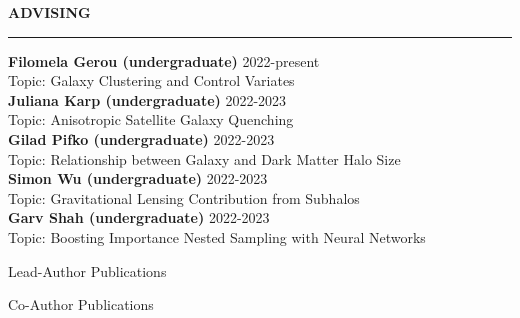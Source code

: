 \documentclass[12pt]{article}
\renewenvironment{section}[1]
  {
  \medskip
  {\color{yaleblue} \MakeUppercase{\bf #1}}
  \smallskip
  \hrule
  \medskip
  \begin{adjustwidth}{0.3cm}{}
  }
  {
  \end{adjustwidth}
  }
\newenvironment{ref-section}[1]
  {
  \medskip
  {\color{yaleblue} \MakeUppercase{\bf #1}}
  \smallskip
  \hrule
  \medskip
  \begin{refsection}
  }
  {
  \end{refsection}
  }
\newcommand{\entry}[3]{{\bf #1} \hfill {#2} \\ {#3}}
\begin{document}
\begin{section}{Advising}
  \entry{Filomela Gerou (undergraduate)}{2022-present}{Topic: Galaxy Clustering and Control Variates} \medskip \\
  \entry{Juliana Karp (undergraduate)}{2022-2023}{Topic: Anisotropic Satellite Galaxy Quenching} \medskip \\
  \entry{Gilad Pifko (undergraduate)}{2022-2023}{Topic: Relationship between Galaxy and Dark Matter Halo Size} \medskip \\
  \entry{Simon Wu (undergraduate)}{2022-2023}{Topic: Gravitational Lensing Contribution from Subhalos} \medskip \\
  \entry{Garv Shah (undergraduate)}{2022-2023}{Topic: Boosting Importance Nested Sampling with Neural Networks} \medskip \\
\end{section}

\begin{ref-section}{Lead-Author Publications}
  \nocite{Lange2023_MNRAS_525_3181, Karp2023_ApJ_949_13, Lange2023_MNRAS_520_5373, Lange2022_MNRAS_509_1779, Lange2021_MNRAS_502_2074, Lange2019_MNRAS_490_1870, Lange2019_MNRAS_488_5771, Lange2019_MNRAS_487_3112, Lange2019_MNRAS_482_4824, Lange2018_MNRAS_473_2830, Lange2016_ApJ_819_4, Lange2015_MNRAS_447_939, Lange2013_AA_551_89}
  \printbibliography[heading=none]
\end{ref-section}

\newpage

\begin{ref-section}{Co-Author Publications}
  \nocite{Hadzhiyska2023_MNRAS_525_4367, Ruggeri2023_MNRAS_525_3865, DESICollaboration2023_arXiv_2306_6308, DESICollaboration2023_arXiv_2306_6307, Xhakaj2023_arXiv_2306_3777, Wang2022_MNRAS_516_4003, DESICollaboration2022_AJ_164_207, Huang2022_MNRAS_515_4722, Xhakaj2022_MNRAS_514_2876, Dawson2022_arXiv_2203_7291, Leauthaud2022_MNRAS_510_6150, Wang2020_MNRAS_498_4450, vandenBosch2019_MNRAS_488_4984, Wang2019_MNRAS_488_3541, Zentner2019_MNRAS_485_1196, Campbell2018_MNRAS_477_359, Villarreal2017_MNRAS_472_1088, Nelson2016_ApJ_828_27, Momcheva2016_ApJS_225_27}
  \printbibliography[heading=none]
\end{ref-section}

\newpage
\end{document}
